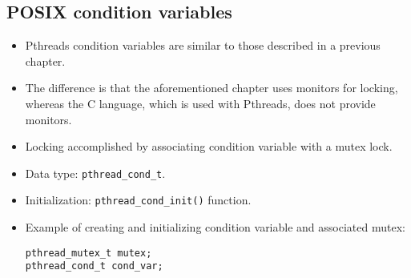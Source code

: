 \subsection{POSIX condition variables}
\begin{itemize}
    \item Pthreads condition variables are similar to those described in a previous chapter.
    \item The difference is that the aforementioned chapter uses monitors for locking, whereas the C language, which is used with Pthreads, does not provide monitors.
    \item Locking accomplished by associating condition variable with a mutex lock.
    \item Data type: \texttt{pthread\_cond\_t}.
    \item Initialization: \texttt{pthread\_cond\_init()} function.
    \item Example of creating and initializing condition variable and associated mutex:
    \begin{verbatim}
pthread_mutex_t mutex;
pthread_cond_t cond_var;
 

\end{verbatim}
\end{itemize}
